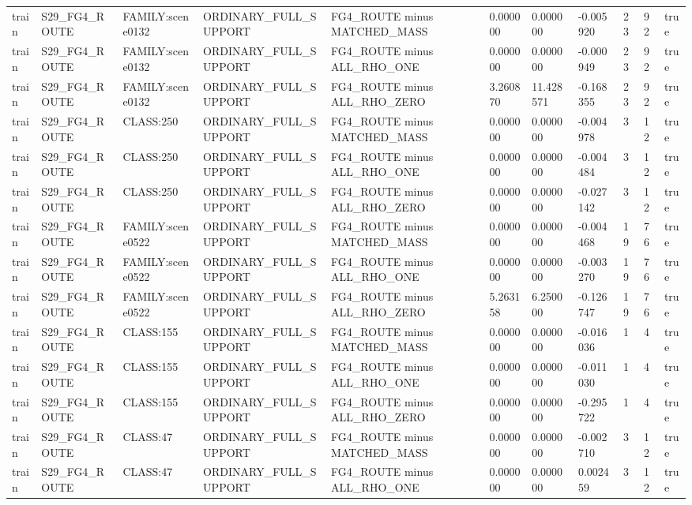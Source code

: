 \begin{tabular}{lllllllllll}
train & S29\_FG4\_ROUTE & FAMILY:scene0132 & ORDINARY\_FULL\_SUPPORT & FG4\_ROUTE minus MATCHED\_MASS & 0.000000 & 0.000000 & -0.005920 & 23 & 92 & true \\
train & S29\_FG4\_ROUTE & FAMILY:scene0132 & ORDINARY\_FULL\_SUPPORT & FG4\_ROUTE minus ALL\_RHO\_ONE & 0.000000 & 0.000000 & -0.000949 & 23 & 92 & true \\
train & S29\_FG4\_ROUTE & FAMILY:scene0132 & ORDINARY\_FULL\_SUPPORT & FG4\_ROUTE minus ALL\_RHO\_ZERO & 3.260870 & 11.428571 & -0.168355 & 23 & 92 & true \\
train & S29\_FG4\_ROUTE & CLASS:250 & ORDINARY\_FULL\_SUPPORT & FG4\_ROUTE minus MATCHED\_MASS & 0.000000 & 0.000000 & -0.004978 & 3 & 12 & true \\
train & S29\_FG4\_ROUTE & CLASS:250 & ORDINARY\_FULL\_SUPPORT & FG4\_ROUTE minus ALL\_RHO\_ONE & 0.000000 & 0.000000 & -0.004484 & 3 & 12 & true \\
train & S29\_FG4\_ROUTE & CLASS:250 & ORDINARY\_FULL\_SUPPORT & FG4\_ROUTE minus ALL\_RHO\_ZERO & 0.000000 & 0.000000 & -0.027142 & 3 & 12 & true \\
train & S29\_FG4\_ROUTE & FAMILY:scene0522 & ORDINARY\_FULL\_SUPPORT & FG4\_ROUTE minus MATCHED\_MASS & 0.000000 & 0.000000 & -0.004468 & 19 & 76 & true \\
train & S29\_FG4\_ROUTE & FAMILY:scene0522 & ORDINARY\_FULL\_SUPPORT & FG4\_ROUTE minus ALL\_RHO\_ONE & 0.000000 & 0.000000 & -0.003270 & 19 & 76 & true \\
train & S29\_FG4\_ROUTE & FAMILY:scene0522 & ORDINARY\_FULL\_SUPPORT & FG4\_ROUTE minus ALL\_RHO\_ZERO & 5.263158 & 6.250000 & -0.126747 & 19 & 76 & true \\
train & S29\_FG4\_ROUTE & CLASS:155 & ORDINARY\_FULL\_SUPPORT & FG4\_ROUTE minus MATCHED\_MASS & 0.000000 & 0.000000 & -0.016036 & 1 & 4 & true \\
train & S29\_FG4\_ROUTE & CLASS:155 & ORDINARY\_FULL\_SUPPORT & FG4\_ROUTE minus ALL\_RHO\_ONE & 0.000000 & 0.000000 & -0.011030 & 1 & 4 & true \\
train & S29\_FG4\_ROUTE & CLASS:155 & ORDINARY\_FULL\_SUPPORT & FG4\_ROUTE minus ALL\_RHO\_ZERO & 0.000000 & 0.000000 & -0.295722 & 1 & 4 & true \\
train & S29\_FG4\_ROUTE & CLASS:47 & ORDINARY\_FULL\_SUPPORT & FG4\_ROUTE minus MATCHED\_MASS & 0.000000 & 0.000000 & -0.002710 & 3 & 12 & true \\
train & S29\_FG4\_ROUTE & CLASS:47 & ORDINARY\_FULL\_SUPPORT & FG4\_ROUTE minus ALL\_RHO\_ONE & 0.000000 & 0.000000 & 0.002459 & 3 & 12 & true \\

\end{tabular}
